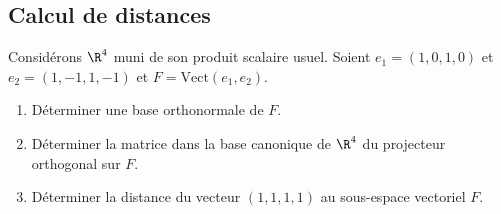\documentclass[a4paper,twoside,french,11pt]{VcCours}
\begin{document}
\subsection{Calcul de distances}



\begin{Exercice}{} Considérons $\R^4$ muni de son produit scalaire usuel. Soient $e_1=(1,0,1,0)$ et $e_2=(1,-1,1,-1)$ et $F=\textrm{Vect}(e_1,e_2)$.
\begin{enumerate}
    \item  Déterminer une base orthonormale de $F.$
    \item  Déterminer la matrice dans la base canonique de $\R^4$ du projecteur orthogonal
sur $F.$
    \item  Déterminer la distance du vecteur $(1,1,1,1)$ au sous-espace vectoriel  $F.$
\end{enumerate}
\end{Exercice}
\end{document}
